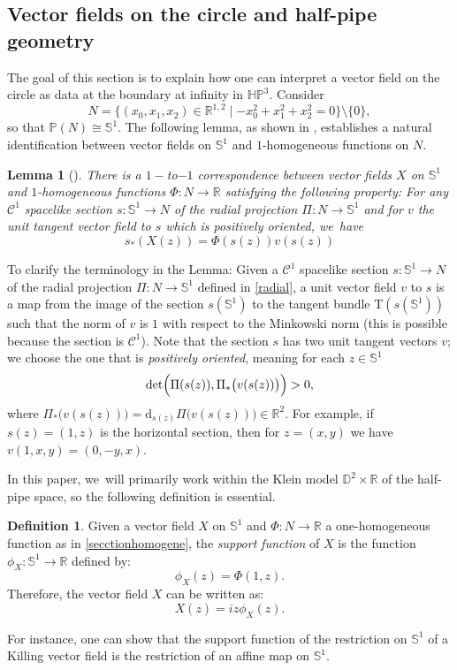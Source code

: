 \documentclass[10pt]{amsart}
\theoremstyle{plain}
\newtheorem{lemma}[cor]{Lemma}
\theoremstyle{definition}
\newtheorem{defi}[cor]{Definition}
\newcommand{\minko}{\mathbb{R}^{1,2}}
\newcommand{\HP}{\mathbb{HP}^3}
\begin{document}
\subsection{Vector fields on the circle and half-pipe geometry}
The goal of this section is to explain how one can interpret a vector field on the circle as data at the boundary at infinity in $\HP$. Consider
\[
N=\{(x_0,x_1,x_2)\in\minko\mid -x_0^2+x_1^2+x_2^2=0\}\setminus\{0\},\]
so that $\mathbb{P}(N)\cong\mathbb{S}^1$. The following lemma, as shown in \cite{BS17}, establishes a natural identification between vector fields on $\mathbb{S}^1$ and $1$-homogeneous functions on $N$.

\begin{lemma}[{\cite[Lem.\,2.23]{BS17}}]\label{homogene}
There is a $1-$to$-1$ correspondence between vector fields $X$ on $\mathbb{S}^1$ and $1$-homogeneous functions $\Phi:N\to\mathbb{R}$ satisfying the following property: For any $\mathcal{C}^1$ spacelike section $s:\mathbb{S}^1\to N$ of the radial projection $\Pi:N\to\mathbb{S}^1$ and for $v$ the unit tangent vector field to
$s$ which is positively oriented, we~have
\begin{equation}\label{secctionhomogene}
s_*(X(z))=\Phi(s(z))v(s(z))
\end{equation}
\end{lemma}
To clarify the terminology in the Lemma: Given a $\mathcal{C}^1$ spacelike section $s:\mathbb{S}^1\to N$ of the radial projection $\Pi:N\to\mathbb{S}^1$ defined in \eqref{radial}, a unit vector field $v$ to $s$ is a map from the image of the section $s(\mathbb{S}^1)$ to the tangent bundle $\mathrm{T}(s(\mathbb{S}^1))$ such that the norm of $v$ is $1$ with respect to the Minkowski norm (this is possible because the section is $\mathcal{C}^1$). Note that the section $s$ has two unit tangent vectors $v$; we choose the one that is \emph{positively oriented}, meaning for each $z\in \mathbb{S}^1$
\[
\det\Bigl(\Pi(s(z)),\Pi_*\bigl(v(s(z))\bigr)\Bigr)>0,
\]
where $\Pi_*\bigl(v(s(z))\bigr)=\mathrm{d}_{s(z)}\Pi\bigl(v(s(z))\bigr)\in\mathbb{R}^2$. For example, if $s(z)=(1,z)$ is the horizontal section, then for $z=(x,y)$ we have $v(1,x,y)=(0,-y,x)$.

In this paper, we~will primarily work within the Klein model $\mathbb{D}^2\times\mathbb{R}$ of the half-pipe space, so the following definition is essential.

\begin{defi}\label{supportfunction}
Given a vector field $X$ on $\mathbb{S}^1$ and $\Phi:N\to \mathbb{R}$ a one-homogeneous function as in \eqref{secctionhomogene}, the \emph{support function} of $X$ is the function $\phi_X:\mathbb{S}^1\to \mathbb{R}$ defined by:
\[
\phi_X(z)=\Phi(1,z).
\]
Therefore, the vector field $X$ can be written as: \begin{equation}\label{supportfunction_vs_vectorfield}
X(z)=iz\phi_{X}(z).
\end{equation}
\end{defi}
For instance, one can show that the support function of the restriction on $\mathbb{S}^1$ of a Killing vector field is the restriction of an affine map on $\mathbb{S}^1$.
\end{document}
